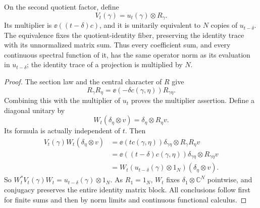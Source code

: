 \begin{lemma}\label{nil:absorption}
On the second quotient factor, define
\[
 V_t(\gamma)=u_t(\gamma)\otimes R_\gamma.
\]
Its multiplier is \(\ee((t-\delta)c)\), and it is unitarily
equivalent to \(N\) copies of \(u_{t-\delta}\).
The equivalence fixes the quotient-identity fiber, preserving
the identity trace with its unnormalized matrix sum.
Thus every coefficient sum, and every continuous spectral
function of it, has the same operator norm as its evaluation
in \(u_{t-\delta}\); the identity trace of a projection is
multiplied by \(N\).
\end{lemma}

\begin{proof}
The section law and the central character of \(R\) give
\[
 R_\gamma R_\eta
       =\ee(-\delta c(\gamma,\eta))R_{\gamma\eta}.
\]
Combining this with the multiplier of \(u_t\) proves the
multiplier assertion. Define a diagonal unitary by
\[
 W_t(\delta_\eta\otimes v)=\delta_\eta\otimes R_\eta v.
\]
Its formula is actually independent of \(t\). Then
\begin{align*}
 V_t(\gamma)W_t(\delta_\eta\otimes v)
  &=\ee(t c(\gamma,\eta))
                 \delta_{\gamma\eta}\otimes R_\gamma R_\eta v\\
  &=\ee((t-\delta)c(\gamma,\eta))
                 \delta_{\gamma\eta}\otimes R_{\gamma\eta}v\\
  &=W_t(u_{t-\delta}(\gamma)\otimes1_N)
                 (\delta_\eta\otimes v).
\end{align*}
So \(W_t^*V_t(\gamma)W_t=u_{t-\delta}(\gamma)\otimes1_N\).
As \(R_1=1_N\), \(W_t\) fixes \(\delta_1\otimes\mathbb C^N\)
pointwise, and conjugacy preserves the entire identity matrix
block. All conclusions follow first for finite sums and then
by norm limits and continuous functional calculus.
\end{proof}


